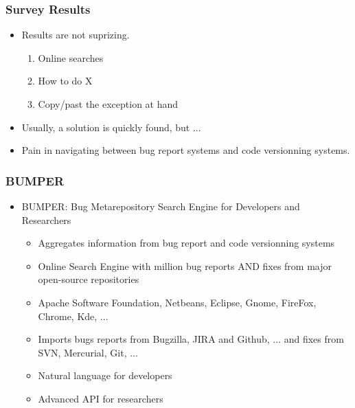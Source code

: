 \documentclass{beamer}
\begin{document}
\begin{frame}

  \frametitle{Survey Results}

\begin{itemize}
  \item Results are not suprizing.
  \begin{enumerate}
    \item Online searches
    \item How to do X
    \item Copy/past the exception at hand
  \end{enumerate}
  \item Usually, a solution is quickly found, but ...
  \item Pain in navigating between bug report systems and code versionning systems.
\end{itemize}

\end{frame}


\begin{frame}

\frametitle{BUMPER}
\begin{itemize}
\item BUMPER: Bug Metarepository Search Engine for Developers and Researchers
\begin{itemize}
\item Aggregates information from bug report and code versionning systems
\item Online Search Engine with million bug reports AND fixes from major open-source repositories
\item Apache Software Foundation, Netbeans, Eclipse, Gnome, FireFox, Chrome, Kde, ...
\item Imports bugs reports from Bugzilla, JIRA and Github, ... and fixes from SVN, Mercurial, Git, ...
\item Natural language for developers
\item Advanced API for researchers
\end{itemize}

\end{itemize}

\end{frame}
\end{document}
